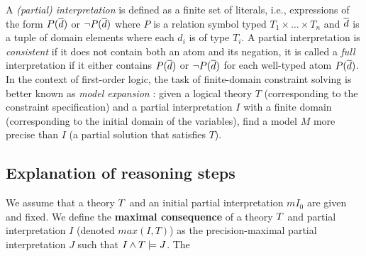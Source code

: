 A \emph{(partial) interpretation} is defined as a finite set of literals, i.e., expressions of the form $P(\overline{d})$ or $\lnot P(\overline{d})$ where $P$ is a relation symbol typed $T_1\times\dots \times T_n$ and $\overline{d}$ is a tuple of domain elements where each $d_i$ is of type $T_i$.
A partial interpretation is \emph{consistent} if it does not contain both an atom and its negation, it is called a \emph{full} interpretation if it either contains $P(\overline{d})$ or $\lnot P(\overline{d})$ for each well-typed atom $P(\overline{d})$. In the context of first-order logic, the task of finite-domain constraint solving is better known as \emph{model expansion} \cite{MitchellTHM06}: given a logical theory $T$ (corresponding to the constraint specification) and a partial interpretation $I$ with a finite domain (corresponding to the initial domain of the variables), find a model $M$ more precise than $I$ (a partial solution that satisfies $T$).

\subsection{Explanation of reasoning steps}
We assume that a theory $T$ and an initial partial interpretation $m{I}_0$ are given and fixed. We define the \textbf{maximal consequence} of a theory $T$ and partial interpretation $I$ (denoted $max(I,T)$) as the precision-maximal partial interpretation $J$ such that  $I \wedge T \models J$. 
The 